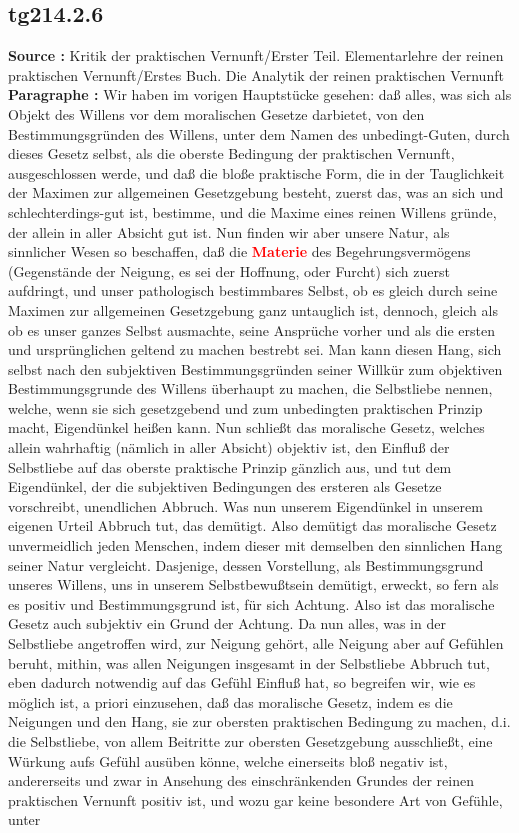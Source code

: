 \documentclass[a4paper,12pt,twoside]{book}
\newcommand{\match}[1]{\textcolor{red}{\textbf{#1}}}
\begin{document}
	\subsection*{tg214.2.6} 
	\textbf{Source : }Kritik der praktischen Vernunft/Erster Teil. Elementarlehre der reinen praktischen Vernunft/Erstes Buch. Die Analytik der reinen praktischen Vernunft\\  
	
	\noindent\textbf{Paragraphe : }Wir haben im vorigen Hauptstücke gesehen: daß alles, was sich als Objekt des Willens vor dem moralischen Gesetze darbietet, von den Bestimmungsgründen des Willens, unter dem Namen des unbedingt-Guten, durch dieses Gesetz selbst, als die oberste Bedingung der praktischen Vernunft, ausgeschlossen werde, und daß die bloße praktische Form, die in der Tauglichkeit der Maximen zur allgemeinen Gesetzgebung besteht, zuerst das, was an sich und schlechterdings-gut ist, bestimme, und die Maxime eines reinen Willens gründe, der allein in aller Absicht gut ist. Nun finden wir aber unsere Natur, als sinnlicher Wesen so beschaffen, daß die \match{Materie} des Begehrungsvermögens (Gegenstände der Neigung, es sei der Hoffnung, oder Furcht) sich zuerst aufdringt, und unser pathologisch bestimmbares Selbst, ob es gleich durch seine Maximen zur allgemeinen Gesetzgebung ganz untauglich ist, dennoch, gleich als ob es unser ganzes Selbst ausmachte, seine Ansprüche vorher und als die ersten und ursprünglichen geltend zu machen bestrebt sei. Man kann diesen Hang, sich selbst nach den subjektiven Bestimmungsgründen seiner Willkür zum objektiven Bestimmungsgrunde des Willens überhaupt zu machen, die Selbstliebe nennen, welche, wenn sie sich gesetzgebend und zum unbedingten praktischen Prinzip macht, Eigendünkel heißen kann. Nun schließt das moralische Gesetz, welches allein wahrhaftig (nämlich in aller Absicht) objektiv ist, den Einfluß der Selbstliebe auf das oberste praktische Prinzip gänzlich aus, und tut dem Eigendünkel, der die subjektiven Bedingungen des ersteren als Gesetze vorschreibt, unendlichen Abbruch. Was nun unserem Eigendünkel in unserem eigenen Urteil Abbruch tut, das demütigt. Also demütigt das moralische Gesetz unvermeidlich  jeden Menschen, indem dieser mit demselben den sinnlichen Hang seiner Natur vergleicht. Dasjenige, dessen Vorstellung, als Bestimmungsgrund unseres Willens, uns in unserem Selbstbewußtsein demütigt, erweckt, so fern als es positiv und Bestimmungsgrund ist, für sich Achtung. Also ist das moralische Gesetz auch subjektiv ein Grund der Achtung. Da nun alles, was in der Selbstliebe angetroffen wird, zur Neigung gehört, alle Neigung aber auf Gefühlen beruht, mithin, was allen Neigungen insgesamt in der Selbstliebe Abbruch tut, eben dadurch notwendig auf das Gefühl Einfluß hat, so begreifen wir, wie es möglich ist, a priori einzusehen, daß das moralische Gesetz, indem es die Neigungen und den Hang, sie zur obersten praktischen Bedingung zu machen, d.i. die Selbstliebe, von allem Beitritte zur obersten Gesetzgebung ausschließt, eine Würkung aufs Gefühl ausüben könne, welche einerseits bloß negativ ist, andererseits und zwar in Ansehung des einschränkenden Grundes der reinen praktischen Vernunft positiv ist, und wozu gar keine besondere Art von Gefühle, unter 
\end{document}
